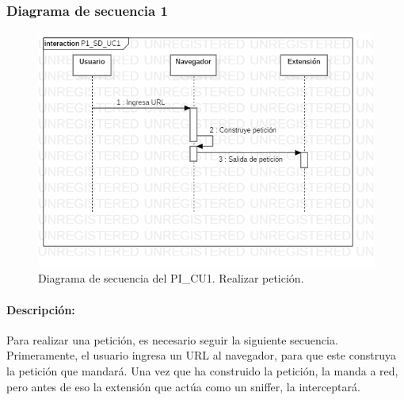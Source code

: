 \documentclass[12pt, a4paper, titlepage]{report}
\begin{document}
            	\subsubsection{Diagrama de secuencia 1}
            	\begin{figure}[H]
				    \begin{center} \includegraphics[width=15cm]{./imagenes/Desarrollo/Prototipo_1/P1_SD_UC1.png}
				    \caption[Diagrama de secuencia 1 del Prototipo I]{Diagrama de secuencia del PI\_CU1. Realizar petición.}
			        \end{center}
			    \end{figure}
			    
			    \paragraph{Descripción:}
			    Para realizar una petición, es necesario seguir la siguiente secuencia. Primeramente, el usuario ingresa un URL al navegador, para que este construya la petición que mandará. Una vez que ha construido la petición, la manda a red, pero antes de eso la extensión que actúa como un sniffer, la interceptará.
			    
\end{document}
